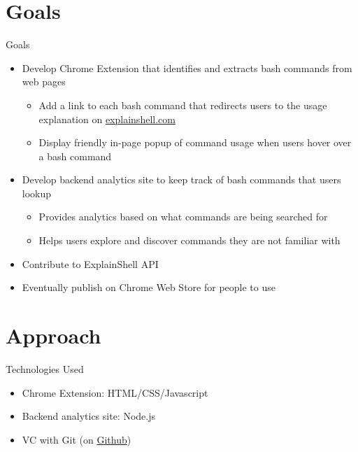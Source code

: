 \documentclass[xcolor=dvipsnames]{beamer}
\begin{document}
\section{Goals}\label{goals}
\begin{frame}{Goals}
\begin{itemize}
\itemsep5pt\parskip0pt
\item<1->
  Develop Chrome Extension that identifies and extracts bash commands
  from web pages

  \begin{itemize}
  \itemsep3pt\parskip0pt
  \item<1->
    Add a link to each bash command that redirects users to the usage
    explanation on \href{http://www.explainshell.com/}{explainshell.com}
  \item<1->
    Display friendly in-page popup of command usage when users hover
    over a bash command
  \end{itemize}
\item<2->
  Develop backend analytics site to keep track of bash commands that
  users lookup

  \begin{itemize}
  \itemsep3pt\parskip0pt
  \item<2->
    Provides analytics based on what commands are being searched for
  \item<2->
    Helps users explore and discover commands they are not familiar with
  \end{itemize}
\item<3->
  Contribute to ExplainShell API
\item<4->
  Eventually publish on Chrome Web Store for people to use
\end{itemize}
\end{frame}

\section{Approach}\label{approach}
\begin{frame}{Technologies Used}
\begin{itemize}
\itemsep5pt\parskip0pt
\item
  Chrome Extension: HTML/CSS/Javascript
\item
  Backend analytics site: Node.js
\item
  VC with Git (on \href{gitrepo}{Github})
\end{itemize}
\end{frame}
\end{document}
